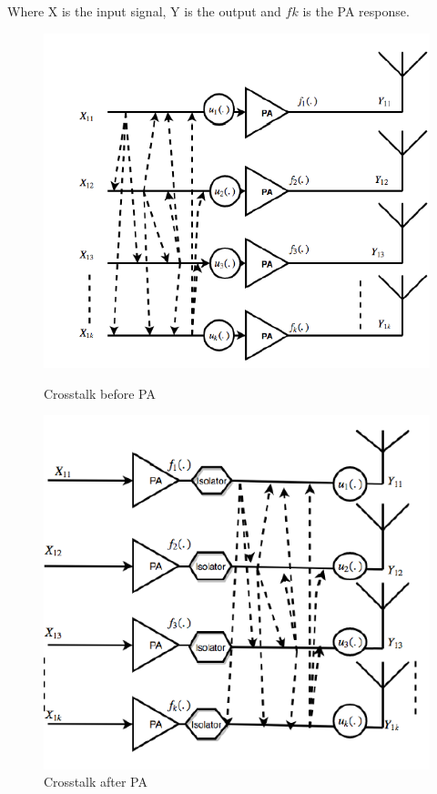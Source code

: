 Where X is the input signal, Y is the output and $fk$ is the PA response. 

\begin{figure}[H]
  \centering
  \begin{minipage}[b]{0.5\textwidth}
	\includegraphics[scale = 0.5]{figures/ch1/crosstalk_before}
	\caption{Crosstalk before PA \citep{islam2017}}	
    \label{fig:cross_bf}
  \end{minipage}
  \hfill
  \begin{minipage}[b]{0.4\textwidth}
	\includegraphics[scale = 0.5]{figures/ch1/crosstalk_after}
	\caption{Crosstalk after PA \citep{islam2017}}
    \label{fig:cross_af}
  \end{minipage}
\end{figure}

